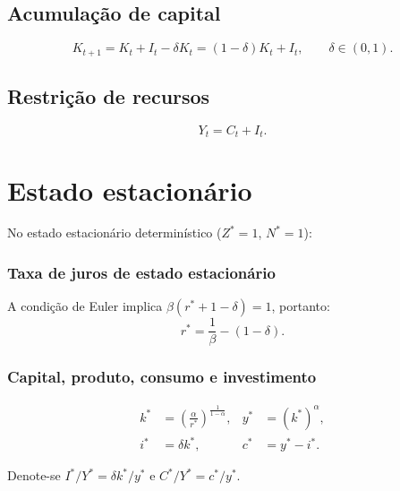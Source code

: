 \documentclass[11pt,a4paper]{article}
\begin{document}
\subsection{Acumulação de capital}

\begin{equation}\label{eq:capital}
  K_{t+1} = K_t + I_t - \delta K_t = (1-\delta)K_t + I_t,
  \qquad \delta\in(0,1).
\end{equation}

\subsection{Restrição de recursos}

\begin{equation}
  Y_t = C_t + I_t.
\end{equation}

\section{Estado estacionário}

No estado estacionário determinístico ($Z^* = 1$, $N^* = 1$):

\subsubsection*{Taxa de juros de estado estacionário}

A condição de Euler implica $\beta(r^*+1-\delta)=1$, portanto:
\begin{equation}
  r^* = \frac{1}{\beta} - (1-\delta).
\end{equation}

\subsubsection*{Capital, produto, consumo e investimento}

\begin{align}
  k^* &= \left(\frac{\alpha}{r^*}\right)^{\!\tfrac{1}{1-\alpha}}, &
  y^* &= (k^*)^{\alpha}, \\
  i^* &= \delta k^*, &
  c^* &= y^* - i^*.
\end{align}

Denote-se $I^*/Y^* = \delta k^*/y^*$ e $C^*/Y^* = c^*/y^*$.

\end{document}
